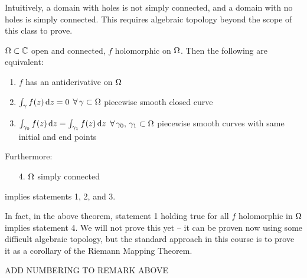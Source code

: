 \begin{note}
Intuitively, a domain with holes is not simply connected, and a domain with no holes is simply connected. This requires algebraic topology beyond the scope of this class to prove.
\end{note}

\begin{theorem}
$\Omega \subset \mathbb{C}$ open and connected, $f$ holomorphic on $\Omega$. Then the following are equivalent:

\begin{enumerate}
    \item $f$ has an antiderivative on $\Omega$
    \item $\int_\gamma f(z) \dif z = 0$ $\forall \, \gamma \subset \Omega$ piecewise smooth closed curve
    \item $\int_{\gamma_0} f(z) \dif z = \int_{\gamma_1} f(z) \dif z$ $\forall \, \gamma_0, \, \gamma_1 \subset \Omega$ piecewise smooth curves with same initial and end points
\end{enumerate}


Furthermore:

\begin{enumerate}
    \item[4.] $\Omega$ simply connected
\end{enumerate}

implies statements 1, 2, and 3.

\end{theorem}

\begin{remark}
In fact, in the above theorem, statement 1 holding true for all $f$ holomorphic in $\Omega$ implies statement 4. We will not prove this yet -- it can be proven now using some difficult algebraic topology, but the standard approach in this course is to prove it as a corollary of the Riemann Mapping Theorem. 
\end{remark}


ADD NUMBERING TO REMARK ABOVE

